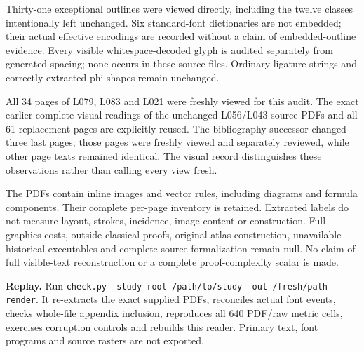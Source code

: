 \documentclass[11pt,a4paper]{article}
\begin{document}
Thirty-one exceptional outlines were viewed directly, including the twelve classes intentionally left unchanged. Six standard-font dictionaries are not embedded; their actual effective encodings are recorded without a claim of embedded-outline evidence. Every visible whitespace-decoded glyph is audited separately from generated spacing; none occurs in these source files. Ordinary ligature strings and correctly extracted phi shapes remain unchanged.

All 34 pages of L079, L083 and L021 were freshly viewed for this audit. The exact earlier complete visual readings of the unchanged L056/L043 source PDFs and all 61 replacement pages are explicitly reused. The bibliography successor changed three last pages; those pages were freshly viewed and separately reviewed, while other page texts remained identical. The visual record distinguishes these observations rather than calling every view fresh.

The PDFs contain inline images and vector rules, including diagrams and formula components. Their complete per-page inventory is retained. Extracted labels do not measure layout, strokes, incidence, image content or construction. Full graphics costs, outside classical proofs, original atlas construction, unavailable historical executables and complete source formalization remain null. No claim of full visible-text reconstruction or a complete proof-complexity scalar is made.

\textbf{Replay.} Run \texttt{check.py --study-root /path/to/study --out /fresh/path --render}. It re-extracts the exact supplied PDFs, reconciles actual font events, checks whole-file appendix inclusion, reproduces all 640 PDF/raw metric cells, exercises corruption controls and rebuilds this reader. Primary text, font programs and source rasters are not exported.
\end{document}
